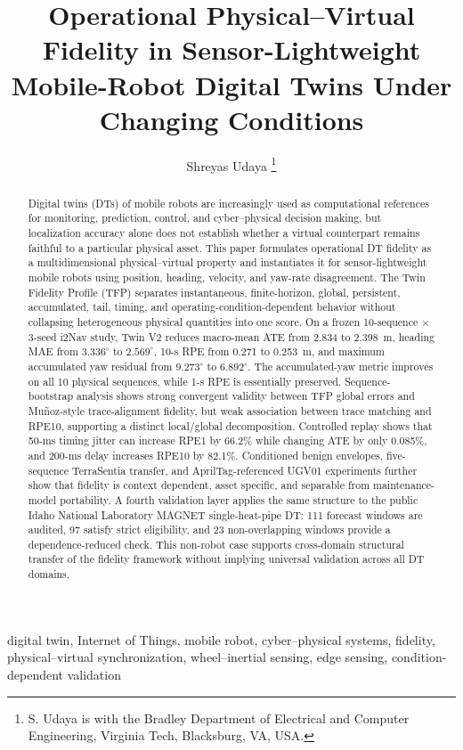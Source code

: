 \documentclass[journal]{IEEEtran}
\title{Operational Physical--Virtual Fidelity in Sensor-Lightweight Mobile-Robot Digital Twins Under Changing Conditions}
\author{Shreyas Udaya%
\thanks{S. Udaya is with the Bradley Department of Electrical and Computer Engineering, Virginia Tech, Blacksburg, VA, USA.}%
}
\begin{document}
\maketitle

\begin{abstract}
Digital twins (DTs) of mobile robots are increasingly used as computational references for monitoring, prediction, control, and cyber--physical decision making, but localization accuracy alone does not establish whether a virtual counterpart remains faithful to a particular physical asset. This paper formulates operational DT fidelity as a multidimensional physical--virtual property and instantiates it for sensor-lightweight mobile robots using position, heading, velocity, and yaw-rate disagreement. The Twin Fidelity Profile (TFP) separates instantaneous, finite-horizon, global, persistent, accumulated, tail, timing, and operating-condition-dependent behavior without collapsing heterogeneous physical quantities into one score. On a frozen 10-sequence $\times$ 3-seed i2Nav study, Twin V2 reduces macro-mean ATE from 2.834 to 2.398~m, heading MAE from $3.336^{\circ}$ to $2.569^{\circ}$, 10-s RPE from 0.271 to 0.253~m, and maximum accumulated yaw residual from $9.273^{\circ}$ to $6.892^{\circ}$. The accumulated-yaw metric improves on all 10 physical sequences, while 1-s RPE is essentially preserved. Sequence-bootstrap analysis shows strong convergent validity between TFP global errors and Mu\~noz-style trace-alignment fidelity, but weak association between trace matching and RPE10, supporting a distinct local/global decomposition. Controlled replay shows that 50-ms timing jitter can increase RPE1 by 66.2\% while changing ATE by only 0.085\%, and 200-ms delay increases RPE10 by 82.1\%. Conditioned benign envelopes, five-sequence TerraSentia transfer, and AprilTag-referenced UGV01 experiments further show that fidelity is context dependent, asset specific, and separable from maintenance-model portability. A fourth validation layer applies the same structure to the public Idaho National Laboratory MAGNET single-heat-pipe DT: 111 forecast windows are audited, 97 satisfy strict eligibility, and 23 non-overlapping windows provide a dependence-reduced check. This non-robot case supports cross-domain structural transfer of the fidelity framework without implying universal validation across all DT domains.
\end{abstract}

\begin{IEEEkeywords}
digital twin, Internet of Things, mobile robot, cyber--physical systems, fidelity, physical--virtual synchronization, wheel--inertial sensing, edge sensing, condition-dependent validation
\end{IEEEkeywords}
\end{document}
